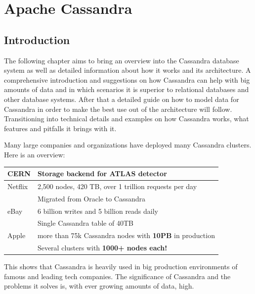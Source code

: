 \chapter{Apache Cassandra}

\section{Introduction}


The following chapter aims to bring an overview into the Cassandra database system as well as detailed information about how it works and its architecture.
A comprehensive introduction and suggestions on how Cassandra can help with big amounts of data and in which scenarios it is superior to relational databases and other database systems. After that a detailed guide on how to model data for Cassandra in order to make the best use out of the architecture will follow.
Transitioning into technical details and examples on how Cassandra works, what features and pitfalls it brings with it.


Many large companies and organizations have deployed many Cassandra clusters. 
Here is an overview: \\

  \begin{tabular}{@{}ll}
    CERN    & Storage backend for ATLAS detector \autocite{cassandra_cern} \\
    \hline
    Netflix & 2,500 nodes, 420 TB, over 1 trillion requests per day \\
            & Migrated from Oracle to Cassandra \autocite{cassandra_netflix} \\
    \hline
    eBay    & 6 billion writes and 5 billion reads daily \\
            & Single Cassandra table of 40TB \autocite{cassandra_ebay, cassandra_ebay2} \\
    \hline
    Apple   & more than 75k Cassandra nodes with \textbf{10PB} in production \\
            & Several clusters with \textbf{1000+ nodes each!} \autocite{cassandra_apple} \\
  \end{tabular}

This shows that Cassandra is heavily used in big production environments of famous and leading tech companies. The significance of Cassandra and the problems it solves is, with ever growing amounts of data, high.



